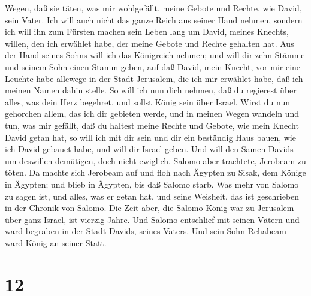Wegen, daß sie täten, was mir wohlgefällt, meine Gebote und Rechte, wie
David, sein Vater.  Ich will auch nicht das ganze Reich aus
seiner Hand nehmen, sondern ich will ihn zum Fürsten machen sein Leben
lang um David, meines Knechts, willen, den ich erwählet habe, der meine
Gebote und Rechte gehalten hat.  Aus der Hand seines Sohns
will ich das Königreich nehmen; und will dir zehn Stämme 
und seinem Sohn einen Stamm geben, auf daß David, mein Knecht, vor mir
eine Leuchte habe allewege in der Stadt Jerusalem, die ich mir erwählet
habe, daß ich meinen Namen dahin stelle.  So will ich nun
dich nehmen, daß du regierest über alles, was dein Herz begehret, und
sollst König sein über Israel.  Wirst du nun gehorchen
allem, das ich dir gebieten werde, und in meinen Wegen wandeln und tun,
was mir gefällt, daß du haltest meine Rechte und Gebote, wie mein Knecht
David getan hat, so will ich mit dir sein und dir ein beständig Haus
bauen, wie ich David gebauet habe, und will dir Israel geben.
 Und will den Samen Davids um deswillen demütigen, doch
nicht ewiglich.  Salomo aber trachtete, Jerobeam zu töten.
Da machte sich Jerobeam auf und floh nach Ägypten zu Sisak, dem Könige
in Ägypten; und blieb in Ägypten, bis daß Salomo starb. 
Was mehr von Salomo zu sagen ist, und alles, was er getan hat, und seine
Weisheit, das ist geschrieben in der Chronik von Salomo. 
Die Zeit aber, die Salomo König war zu Jerusalem über ganz Israel, ist
vierzig Jahre.  Und Salomo entschlief mit seinen Vätern und
ward begraben in der Stadt Davids, seines Vaters. Und sein Sohn Rehabeam
ward König an seiner Statt.

\hypertarget{section-11}{%
\section{12}\label{section-11}}

